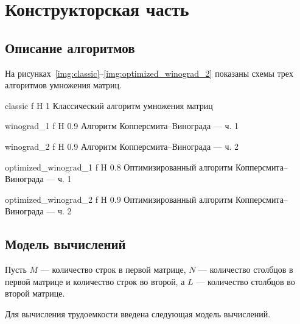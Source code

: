 \chapter{Конструкторская часть}
\section{Описание алгоритмов}

На рисунках~\ref{img:classic}--\ref{img:optimized_winograd_2} показаны схемы трех алгоритмов умножения матриц.

    {classic}
    {f}
    {H}
    {1\textwidth}
    {Классический алгоритм умножения матриц}
    
    {winograd_1}
    {f}
    {H}
    {0.9\textwidth}
    {Алгоритм Копперсмита--Винограда --- ч. 1}
    
    {winograd_2}
    {f}
    {H}
    {0.9\textwidth}
    {Алгоритм Копперсмита--Винограда --- ч. 2}
    
    {optimized_winograd_1}
    {f}
    {H}
    {0.8\textwidth}
    {Оптимизированный алгоритм Копперсмита--Винограда --- ч. 1}
    
    {optimized_winograd_2}
    {f}
    {H}
    {0.9\textwidth}
    {Оптимизированный алгоритм Копперсмита--Винограда --- ч. 2}

\section{Модель вычислений}

Пусть $M$ --- количество строк в первой матрице, $N$ --- количество столбцов в первой матрице и количество строк во второй, а $L$ --- количество столбцов во второй матрице.

Для вычисления трудоемкости введена следующая модель вычислений.

